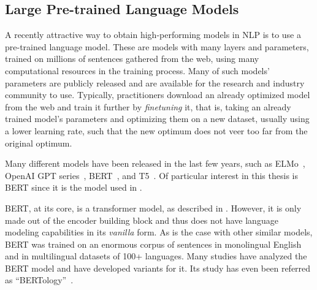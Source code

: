 
\subsection{Large Pre-trained Language Models}
\label{sec:pretrained-bg}

\noindent A recently attractive way to obtain high-performing models in NLP is
to use a pre-trained language model. These are models with many
layers and parameters, trained on millions of sentences gathered from
the web, using many computational resources in the training process.
Many of such models' parameters are publicly released and are
available for the research and industry community to use. Typically,
practitioners download an already optimized model from the web and
train it further by \textit{finetuning} it, that is, taking an
already trained model's parameters and optimizing them on a new
dataset, usually using a lower learning rate, such that the new
optimum does not veer too far from the original optimum.

Many different models have been released in the last few years, such
as ELMo~\citep{peters2018deep}, OpenAI GPT
series~\citep{radford2018improving, brown2020language},
BERT~\citep{devlin2018bert}, and
T5~\citep{raffel2020Exploringlimitstransfer}. Of particular interest
in this thesis is BERT since it is the model used in
.

BERT, at its core, is a transformer model, as described in
. However, it is only made out of the
encoder building block and thus does not have language modeling
capabilities in its \textit{vanilla} form. As is the case with other
similar models, BERT was trained on an enormous corpus of sentences
in monolingual English and in multilingual datasets of 100+
languages. Many studies have analyzed the BERT model and have
developed variants for it. Its study has even been referred as
``BERTology''~\citep{rogers2020PrimerBERTologyWhat}.
